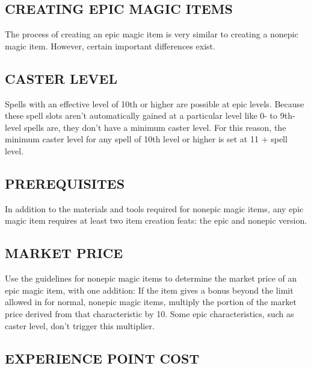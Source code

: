 \documentclass{article}
\begin{document}
\vspace{12pt}
\subsection*{CREATING EPIC MAGIC ITEMS }

The process of creating an epic magic item is very similar to creating a nonepic 
magic item. However, certain important differences exist. 

\vspace{12pt}
\subsection*{CASTER LEVEL }

Spells with an effective level of 10th or higher are possible at epic levels. Because 
these spell slots aren't automatically gained at a particular level like 0- to 
9th-level spells are, they don't have a minimum caster level. For this reason, 
the minimum caster level for any spell of 10th level or higher is set at 11 + spell 
level. 

\vspace{12pt}
\subsection*{PREREQUISITES }

In addition to the materials and tools required for nonepic magic items\textit{, 
}any epic magic item requires at least two item creation feats: the epic and nonepic 
version.

\vspace{12pt}
\subsection*{MARKET PRICE }

Use the guidelines for nonepic magic items\textit{ }to determine the market price 
of an epic magic item, with one addition: If the item gives a bonus beyond the 
limit allowed in for normal, nonepic magic items\textit{, }multiply the portion 
of the market price derived from that characteristic by 10. Some epic characteristics, 
such as caster level, don't trigger this multiplier. 

\vspace{12pt}
\subsection*{EXPERIENCE POINT COST }
\end{document}
